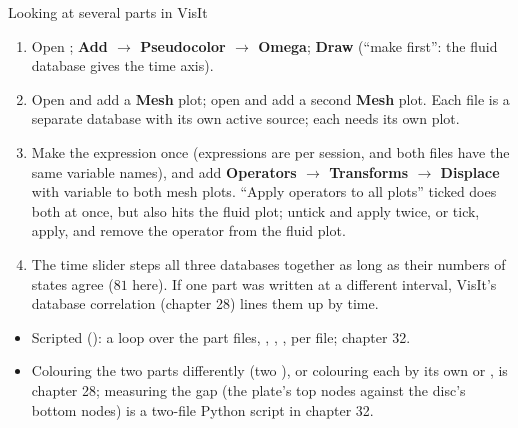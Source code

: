 \documentclass[aspectratio=169,11pt]{beamer}
\begin{document}
\begin{frame}{Looking at several parts in VisIt}
\label{fr:visit}
\footnotesize
\begin{enumerate}
  \item Open ; \textbf{Add $\to$ Pseudocolor $\to$ Omega}; \textbf{Draw} (``make first'': the fluid database gives the time axis).
  \item Open  and add a \textbf{Mesh} plot; open  and add a second \textbf{Mesh} plot. Each file is a separate database with its own active source; each needs its own plot.
  \item Make the expression  once (expressions are per session, and both files have the same variable names), and add \textbf{Operators $\to$ Transforms $\to$ Displace} with variable  to both mesh plots. ``Apply operators to all plots'' ticked does both at once, but also hits the fluid plot; untick and apply twice, or tick, apply, and remove the operator from the fluid plot.
  \item The time slider steps all three databases together as long as their numbers of states agree ($81$ here). If one part was written at a different interval, VisIt's database correlation (chapter 28) lines them up by time.
\end{enumerate}
\begin{itemize}
  \item Scripted (): a loop over the part files, , , ,  per file; chapter 32.
  \item Colouring the two parts differently (two ), or colouring each by its own  or , is chapter 28; measuring the gap (the plate's top nodes against the disc's bottom nodes) is a two-file Python script in chapter 32.
\end{itemize}
\end{frame}
\end{document}
